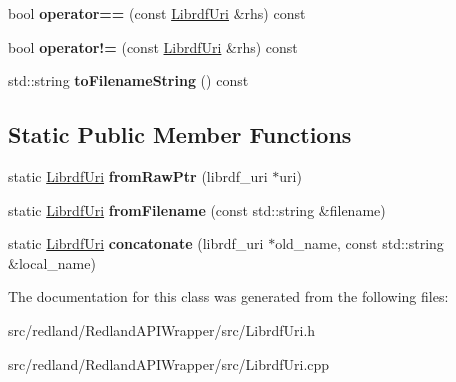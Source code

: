 \begin{DoxyCompactItemize}
\mbox{\label{classredland_1_1LibrdfUri_a02d802c21de7c9dba4133779701e3a45}} 
bool {\bfseries operator==} (const \hyperlink{classredland_1_1LibrdfUri}{Librdf\+Uri} \&rhs) const
\item 
\mbox{\label{classredland_1_1LibrdfUri_a8ded118526be9cfdbe6dbc87d075fb06}} 
bool {\bfseries operator!=} (const \hyperlink{classredland_1_1LibrdfUri}{Librdf\+Uri} \&rhs) const
\item 
\mbox{\label{classredland_1_1LibrdfUri_ad24448f9b22adce080a35decc4694479}} 
std\+::string {\bfseries to\+Filename\+String} () const
\end{DoxyCompactItemize}
\subsection*{Static Public Member Functions}
\begin{DoxyCompactItemize}
\item 
\mbox{\label{classredland_1_1LibrdfUri_a518761e1fbfd8c2f79dcac01b05c720b}} 
static \hyperlink{classredland_1_1LibrdfUri}{Librdf\+Uri} {\bfseries from\+Raw\+Ptr} (librdf\+\_\+uri $\ast$uri)
\item 
\mbox{\label{classredland_1_1LibrdfUri_ad7245bf32a2538d220ec7d3a0afc0802}} 
static \hyperlink{classredland_1_1LibrdfUri}{Librdf\+Uri} {\bfseries from\+Filename} (const std\+::string \&filename)
\item 
\mbox{\label{classredland_1_1LibrdfUri_a58ab2ce202cc9b563d1dc60a20a545b2}} 
static \hyperlink{classredland_1_1LibrdfUri}{Librdf\+Uri} {\bfseries concatonate} (librdf\+\_\+uri $\ast$old\+\_\+name, const std\+::string \&local\+\_\+name)
\end{DoxyCompactItemize}


The documentation for this class was generated from the following files\+:\begin{DoxyCompactItemize}
\item 
src/redland/\+Redland\+A\+P\+I\+Wrapper/src/Librdf\+Uri.\+h\item 
src/redland/\+Redland\+A\+P\+I\+Wrapper/src/Librdf\+Uri.\+cpp\end{DoxyCompactItemize}
